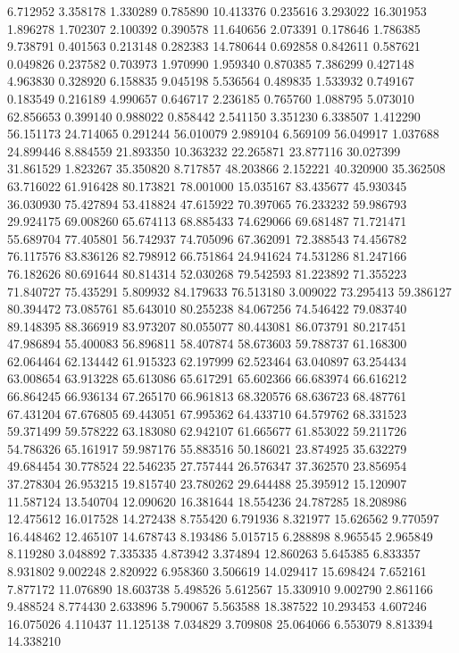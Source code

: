 6.712952
3.358178
1.330289
0.785890
10.413376
0.235616
3.293022
16.301953
1.896278
1.702307
2.100392
0.390578
11.640656
2.073391
0.178646
1.786385
9.738791
0.401563
0.213148
0.282383
14.780644
0.692858
0.842611
0.587621
0.049826
0.237582
0.703973
1.970990
1.959340
0.870385
7.386299
0.427148
4.963830
0.328920
6.158835
9.045198
5.536564
0.489835
1.533932
0.749167
0.183549
0.216189
4.990657
0.646717
2.236185
0.765760
1.088795
5.073010
62.856653
0.399140
0.988022
0.858442
2.541150
3.351230
6.338507
1.412290
56.151173
24.714065
0.291244
56.010079
2.989104
6.569109
56.049917
1.037688
24.899446
8.884559
21.893350
10.363232
22.265871
23.877116
30.027399
31.861529
1.823267
35.350820
8.717857
48.203866
2.152221
40.320900
35.362508
63.716022
61.916428
80.173821
78.001000
15.035167
83.435677
45.930345
36.030930
75.427894
53.418824
47.615922
70.397065
76.233232
59.986793
29.924175
69.008260
65.674113
68.885433
74.629066
69.681487
71.721471
55.689704
77.405801
56.742937
74.705096
67.362091
72.388543
74.456782
76.117576
83.836126
82.798912
66.751864
24.941624
74.531286
81.247166
76.182626
80.691644
80.814314
52.030268
79.542593
81.223892
71.355223
71.840727
75.435291
5.809932
84.179633
76.513180
3.009022
73.295413
59.386127
80.394472
73.085761
85.643010
80.255238
84.067256
74.546422
79.083740
89.148395
88.366919
83.973207
80.055077
80.443081
86.073791
80.217451
47.986894
55.400083
56.896811
58.407874
58.673603
59.788737
61.168300
62.064464
62.134442
61.915323
62.197999
62.523464
63.040897
63.254434
63.008654
63.913228
65.613086
65.617291
65.602366
66.683974
66.616212
66.864245
66.936134
67.265170
66.961813
68.320576
68.636723
68.487761
67.431204
67.676805
69.443051
67.995362
64.433710
64.579762
68.331523
59.371499
59.578222
63.183080
62.942107
61.665677
61.853022
59.211726
54.786326
65.161917
59.987176
55.883516
50.186021
23.874925
35.632279
49.684454
30.778524
22.546235
27.757444
26.576347
37.362570
23.856954
37.278304
26.953215
19.815740
23.780262
29.644488
25.395912
15.120907
11.587124
13.540704
12.090620
16.381644
18.554236
24.787285
18.208986
12.475612
16.017528
14.272438
8.755420
6.791936
8.321977
15.626562
9.770597
16.448462
12.465107
14.678743
8.193486
5.015715
6.288898
8.965545
2.965849
8.119280
3.048892
7.335335
4.873942
3.374894
12.860263
5.645385
6.833357
8.931802
9.002248
2.820922
6.958360
3.506619
14.029417
15.698424
7.652161
7.877172
11.076890
18.603738
5.498526
5.612567
15.330910
9.002790
2.861166
9.488524
8.774430
2.633896
5.790067
5.563588
18.387522
10.293453
4.607246
16.075026
4.110437
11.125138
7.034829
3.709808
25.064066
6.553079
8.813394
14.338210

